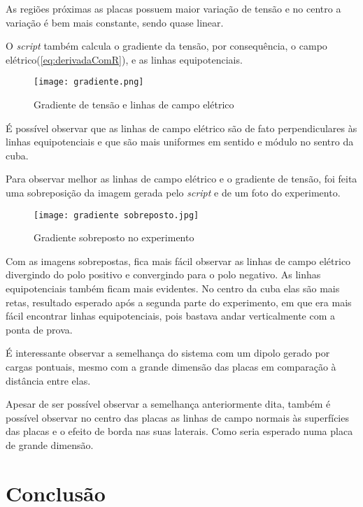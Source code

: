 \documentclass[
12pt,				%
oneside,			%
a4paper,			%
english,			%
french,				%
spanish,			%
brazil				%
]{abntex2}
\begin{document}
As regiões próximas as placas possuem maior variação de tensão e no centro a variação é bem mais constante, sendo quase linear.

\pagebreak
O \textit{script} também calcula o gradiente da tensão, por consequência, o campo elétrico(\autoref{eq:derivadaComR}), e as linhas equipotenciais.

\begin{figure}[H]
	\begin{center}
		\texttt{[image: gradiente.png]}
		\caption{Gradiente de tensão e linhas de campo elétrico}
		\label{fluxograma}
	\end{center}
\end{figure}

É possível observar que as linhas de campo elétrico são de fato perpendiculares às linhas equipotenciais e que são mais uniformes em sentido e módulo no sentro da cuba.
\pagebreak

Para observar melhor as linhas de campo elétrico e o gradiente de tensão, foi feita uma sobreposição da imagem gerada pelo \textit{script} e de um foto do experimento.

\begin{figure}[H]
	\begin{center}
		\texttt{[image: gradiente sobreposto.jpg]}
		\caption{Gradiente sobreposto no experimento}
		\label{gradienteSobreposto}
	\end{center}
\end{figure}

Com as imagens sobrepostas, fica mais fácil observar as linhas de campo elétrico divergindo do polo positivo e convergindo para o polo negativo. As linhas equipotenciais também ficam mais evidentes. No centro da cuba elas são mais retas, resultado esperado após a segunda parte do experimento, em que era mais fácil encontrar linhas equipotenciais, pois bastava andar verticalmente com a ponta de prova.

É interessante observar a semelhança do sistema com um dipolo gerado por cargas pontuais, mesmo com a grande dimensão das placas em comparação à distância entre elas.

Apesar de ser possível observar a semelhança anteriormente dita, também é possível observar no centro das placas as linhas de campo normais às superfícies das placas e o efeito de borda nas suas laterais. Como seria esperado numa placa de grande dimensão.

\chapter{Conclusão}
\end{document}
